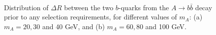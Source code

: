 \documentclass[preprintnumbers,superscriptaddress,nofootinbib,aps,prd,floatfix]{revtex4}
\begin{document}
\begin{figure}[htbp]
\begin{center}
 \\
\caption{\small {Distribution of $\Delta R$ between the two $b$-quarks from the $A \to b\bar{b}$ decay prior to
any selection requirements, for different values of $m_A$: (a) $m_A=20, 30$ and  40 GeV, and (b) $m_A=60, 80$ and 100 GeV.}}
\label{fig:DRbb_ttA} 
\end{center}
\end{figure}
\end{document}
